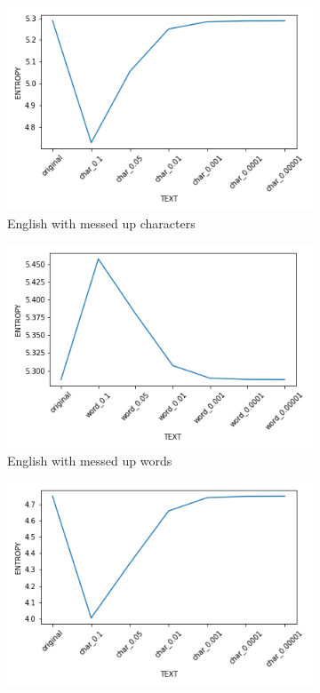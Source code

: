 \documentclass[a4paper]{article}
\begin{document}
\begin{figure}[H]
	\centering
	\begin{subfigure}{0.49\textwidth}
		\includegraphics[width=\textwidth]{figures/en_char_entropy}
		\caption{English with messed up characters}
		\label{fig:en_char_entropy}
	\end{subfigure}
	\hfill
	\begin{subfigure}{0.49\textwidth}
		\includegraphics[width=\textwidth]{figures/en_word_entropy}
		\caption{English with messed up words}
		\label{fig:en_word_entropy}
	\end{subfigure}
	\hfill
	\begin{subfigure}{0.49\textwidth}
		\includegraphics[width=\textwidth]{figures/cz_char_entropy}

\end{subfigure}
\end{figure}
\end{document}
